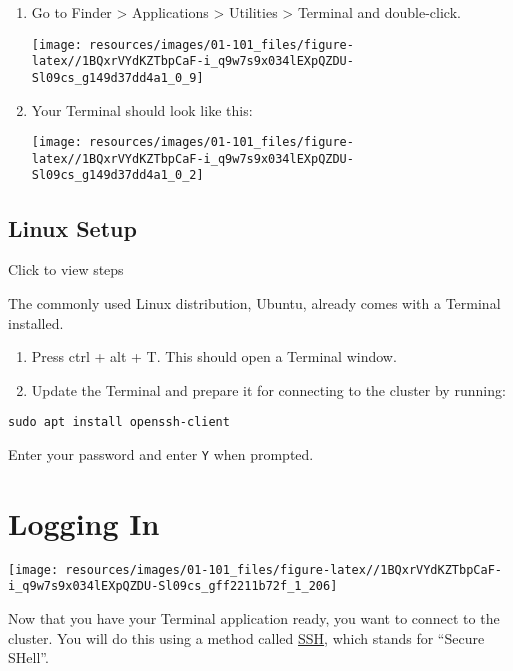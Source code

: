 \documentclass[
]{book}
\begin{document}
\begin{enumerate}
\def\labelenumi{\arabic{enumi}.}
\item
  Go to Finder \textgreater{} Applications \textgreater{} Utilities \textgreater{} Terminal and double-click.

  \texttt{[image: resources/images/01-101\_files/figure-latex//1BQxrVYdKZTbpCaF-i\_q9w7s9x034lEXpQZDU-Sl09cs\_g149d37dd4a1\_0\_9]}
\item
  Your Terminal should look like this:

  \texttt{[image: resources/images/01-101\_files/figure-latex//1BQxrVYdKZTbpCaF-i\_q9w7s9x034lEXpQZDU-Sl09cs\_g149d37dd4a1\_0\_2]}
\end{enumerate}

\hypertarget{linux}{%
\section{Linux Setup}\label{linux}}

Click to view steps

The commonly used Linux distribution, Ubuntu, already comes with a Terminal installed.

\begin{enumerate}
\def\labelenumi{\arabic{enumi}.}
\item
  Press ctrl + alt + T. This should open a Terminal window.
\item
  Update the Terminal and prepare it for connecting to the cluster by running:
\end{enumerate}

\begin{verbatim}
sudo apt install openssh-client
\end{verbatim}

Enter your password and enter \texttt{Y} when prompted.

\hypertarget{logging-in}{%
\chapter{Logging In}\label{logging-in}}

\texttt{[image: resources/images/01-101\_files/figure-latex//1BQxrVYdKZTbpCaF-i\_q9w7s9x034lEXpQZDU-Sl09cs\_gff2211b72f\_1\_206]}

Now that you have your Terminal application ready, you want to connect to the cluster. You will do this using a method called \href{https://www.ssh.com/academy/ssh/protocol}{SSH}, which stands for ``Secure SHell''.
\end{document}
